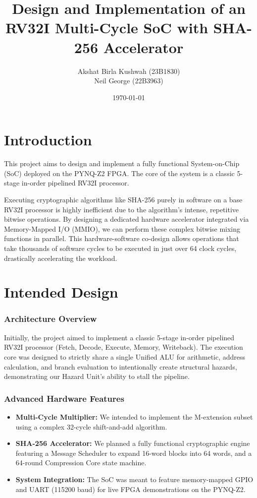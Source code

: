 \documentclass[11pt,a4paper]{article}
\title{\textcolor{primary}{\textbf{Design and Implementation of an RV32I Multi-Cycle SoC with SHA-256 Accelerator}}}
\author{Akshat Birla Kushwah (23B1830) \\ Neil George (22B3963)}
\date{\today}
\begin{document}
\maketitle
\tableofcontents
\newpage

\section{Introduction}
This project aims to design and implement a fully functional System-on-Chip (SoC) deployed on the PYNQ-Z2 FPGA. The core of the system is a classic 5-stage in-order pipelined RV32I processor.

Executing cryptographic algorithms like SHA-256 purely in software on a base RV32I processor is highly inefficient due to the algorithm's intense, repetitive bitwise operations. By designing a dedicated hardware accelerator integrated via Memory-Mapped I/O (MMIO), we can perform these complex bitwise mixing functions in parallel. This hardware-software co-design allows operations that take thousands of software cycles to be executed in just over 64 clock cycles, drastically accelerating the workload.


\section{Intended Design}
\subsubsection*{Architecture Overview}
Initially, the project aimed to implement a classic 5-stage in-order pipelined RV32I processor (Fetch, Decode, Execute, Memory, Writeback). The execution core was designed to strictly share a single Unified ALU for arithmetic, address calculation, and branch evaluation to intentionally create structural hazards, demonstrating our Hazard Unit's ability to stall the pipeline.

\subsubsection*{Advanced Hardware Features}
\begin{itemize}
    \item \textbf{Multi-Cycle Multiplier:} We intended to implement the M-extension subset using a complex 32-cycle shift-and-add algorithm.
    \item \textbf{SHA-256 Accelerator:} We planned a fully functional cryptographic engine featuring a Message Scheduler to expand 16-word blocks into 64 words, and a 64-round Compression Core state machine.
    \item \textbf{System Integration:} The SoC was meant to feature memory-mapped GPIO and UART (115200 baud) for live FPGA demonstrations on the PYNQ-Z2.
\end{itemize}
\end{document}
